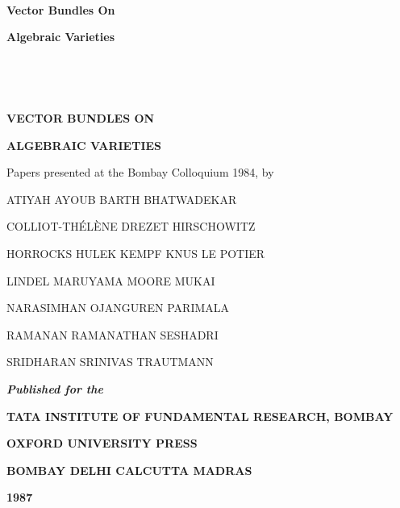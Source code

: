 ~\vfill

\begin{center}
{\Large\bf Vector Bundles On}
\medskip

\thispagestyle{empty}

{\Large\bf Algebraic Varieties}
\end{center}

\vfill\eject

~\phantom{a}
\thispagestyle{empty}

\vfill\eject


\thispagestyle{empty}

~
\vfill

\begin{center}
{\Large\bf VECTOR BUNDLES ON}
\medskip

\thispagestyle{empty}

{\Large\bf ALGEBRAIC VARIETIES}
\end{center}

\vskip 1cm

Papers presented at the Bombay Colloquium 1984, by

\smallskip

\begin{center}
ATIYAH AYOUB BARTH BHATWADEKAR

COLLIOT-TH\'EL\`ENE DREZET HIRSCHOWITZ

HORROCKS HULEK KEMPF KNUS LE POTIER

LINDEL MARUYAMA MOORE MUKAI

NARASIMHAN OJANGUREN PARIMALA

RAMANAN RAMANATHAN SESHADRI

SRIDHARAN SRINIVAS TRAUTMANN

\vfill

{\bf\em Published for the}
\medskip

{\large\bf TATA INSTITUTE OF FUNDAMENTAL RESEARCH, BOMBAY}

\medskip

{\large\bf OXFORD UNIVERSITY PRESS}

\smallskip

{\bf BOMBAY DELHI CALCUTTA MADRAS}

{\bf 1987}
\end{center}


\newpage

~\phantom{a}
\vfill

\thispagestyle{empty}


